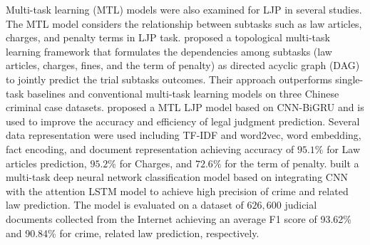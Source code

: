 \documentclass[sn-mathphys,Numbered]{sn-jnl}%
\theoremstyle{thmstyleone}%
\theoremstyle{thmstyletwo}%
\theoremstyle{thmstylethree}%
\begin{document}



Multi-task learning (MTL) models were also examined for LJP in several studies. The MTL model considers the relationship between subtasks such as law articles, charges, and penalty terms in LJP task. \citet{zhong2018legal} proposed a topological multi-task learning framework that formulates the dependencies among subtasks (law articles, charges, fines, and the term of penalty) as directed acyclic graph (DAG) to jointly predict the trial subtasks outcomes. Their approach outperforms single-task baselines and conventional multi-task learning models on three Chinese criminal case datasets. \citet{wang2020study} proposed a MTL LJP model based on CNN-BiGRU and is used to improve the accuracy and efficiency of legal judgment prediction. Several data representation were used including TF-IDF and word2vec, word embedding, fact encoding, and document representation achieving accuracy of $95.1\%$ for Law articles prediction, $95.2\%$ for Charges, and $72.6\%$ for the term of penalty.  %
\citet{huang2019model} built a multi-task deep neural network classification model based on integrating CNN with the attention LSTM model to achieve high precision of crime and related law prediction. %
The model is evaluated on a dataset of $626,600$ judicial documents collected from the Internet achieving an average F1 score of 93.62\% and 90.84\% for crime, related law prediction, respectively. 
\end{document}
